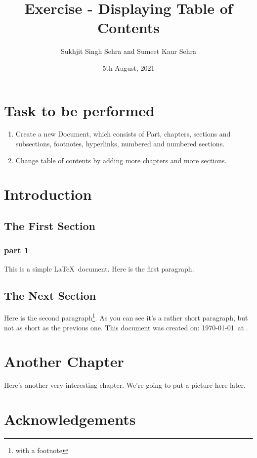 \documentclass[12pt]{report}
\title{Exercise  -  Displaying Table of Contents}
\author{Sukhjit Singh Sehra and Sumeet Kaur Sehra}
\date{5th August, 2021}
\begin{document}
\maketitle

\tableofcontents


\chapter{Task to be performed}
\begin{enumerate}
	\item Create a new Document, which consists of Part, chapters, sections and subsections, footnotes, hyperlinks, numbered and numbered sections.
	\item Change table of contents by adding more chapters and more sections.
\end{enumerate}

\chapter{Introduction}

\section{The First Section}
\subsection{part 1}
This is a simple \LaTeX\ document.
Here is the first paragraph.

\section{The Next Section}

Here is the second paragraph\footnote{with a footnote}. 
As you can see it's a rather short paragraph, but not 
as short as the previous one. This document was 
created on: \today\ at \currenttime.

\chapter{Another Chapter}

Here's another very interesting chapter.
We're going to put a picture here later.

\chapter*{Acknowledgements}
\end{document}
